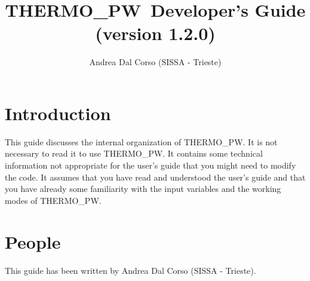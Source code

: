 \documentclass[12pt,a4paper]{article}
\def\version{1.2.0}
\def\tpw{{\sc THERMO\_PW}}
\begin{document}
\author{Andrea Dal Corso (SISSA - Trieste)}
\date{}


\title{
  \vskip 1cm
  {\color{red}\Huge \tpw\ Developer's Guide} \\
  \Large (version \version)
}
\maketitle

\tableofcontents

\newpage

\section{\color{coral}Introduction}
This guide discusses the internal organization of \tpw. It is not necessary
to read it to use \tpw. It contains some technical information not 
appropriate for the user's guide that you might need to modify the code.
It assumes that you have read and understood the user's guide and that
you have already some familiarity with the input variables and 
the working modes of \tpw.

\section{\color{coral}People}
This guide has been written by Andrea Dal Corso (SISSA - Trieste). 

\newpage
\end{document}
